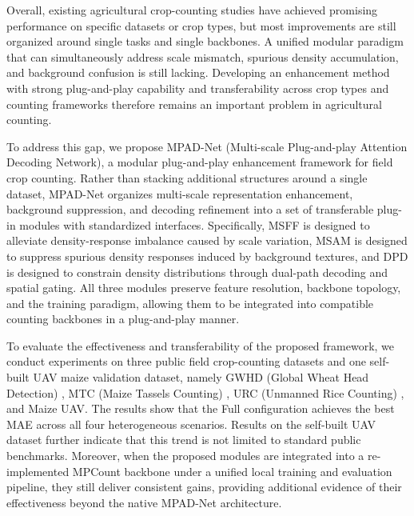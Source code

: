 \documentclass[a4paper,fleqn]{cas-sc}
\begin{document}
	Overall, existing agricultural crop-counting studies have achieved promising performance on specific datasets or crop types, but most improvements are still organized around single tasks and single backbones. A unified modular paradigm that can simultaneously address scale mismatch, spurious density accumulation, and background confusion is still lacking. Developing an enhancement method with strong plug-and-play capability and transferability across crop types and counting frameworks therefore remains an important problem in agricultural counting.
	
	To address this gap, we propose MPAD-Net (Multi-scale Plug-and-play Attention Decoding Network), a modular plug-and-play enhancement framework for field crop counting. Rather than stacking additional structures around a single dataset, MPAD-Net organizes multi-scale representation enhancement, background suppression, and decoding refinement into a set of transferable plug-in modules with standardized interfaces. Specifically, MSFF is designed to alleviate density-response imbalance caused by scale variation, MSAM is designed to suppress spurious density responses induced by background textures, and DPD is designed to constrain density distributions through dual-path decoding and spatial gating. All three modules preserve feature resolution, backbone topology, and the training paradigm, allowing them to be integrated into compatible counting backbones in a plug-and-play manner.
	
	To evaluate the effectiveness and transferability of the proposed framework, we conduct experiments on three public field crop-counting datasets and one self-built UAV maize validation dataset, namely GWHD (Global Wheat Head Detection) \cite{ref2}, MTC (Maize Tassels Counting) \cite{ref4}, URC (Unmanned Rice Counting) \cite{ref5}, and Maize UAV. The results show that the Full configuration achieves the best MAE across all four heterogeneous scenarios. Results on the self-built UAV dataset further indicate that this trend is not limited to standard public benchmarks. Moreover, when the proposed modules are integrated into a re-implemented MPCount backbone under a unified local training and evaluation pipeline, they still deliver consistent gains, providing additional evidence of their effectiveness beyond the native MPAD-Net architecture.
	
\end{document}
